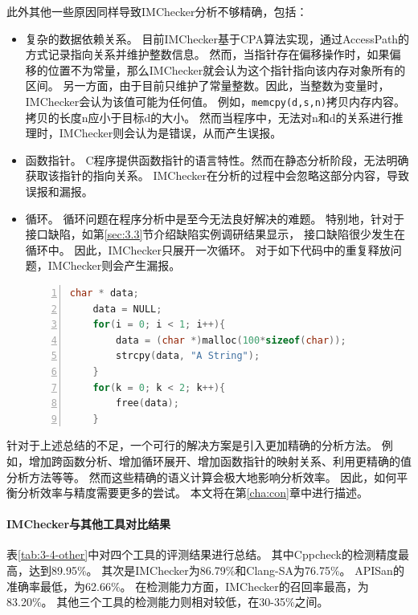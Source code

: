此外其他一些原因同样导致IMChecker分析不够精确，包括：
\begin{itemize}
	\item 复杂的数据依赖关系。
	目前IMChecker基于CPA算法实现，通过AccessPath的方式记录指向关系并维护整数信息。
	然而，当指针存在偏移操作时，如果偏移的位置不为常量，那么IMChecker就会认为这个指针指向该内存对象所有的区间。
	另一方面，由于目前只维护了常量整数。因此，当整数为变量时，IMChecker会认为该值可能为任何值。
	例如，\texttt{memcpy(d,s,n)}拷贝内存内容。
	拷贝的长度n应小于目标d的大小。
	然而当程序中，无法对n和d的关系进行推理时，IMChecker则会认为是错误，从而产生误报。
	\item 函数指针。
	C程序提供函数指针的语言特性。然而在静态分析阶段，无法明确获取该指针的指向关系。
	IMChecker在分析的过程中会忽略这部分内容，导致误报和漏报。
	\item 循环。
	循环问题在程序分析中是至今无法良好解决的难题。
	特别地，针对于接口缺陷，如第\ref{sec:3.3}节介绍缺陷实例调研结果显示，
	接口缺陷很少发生在循环中。
	因此，IMChecker只展开一次循环。
	对于如下代码中的重复释放问题，IMChecker则会产生漏报。
\begin{lstlisting}[language={C},
basicstyle=\linespread{0.7}\listingsfont,
numbers=left,
xleftmargin=.2\textwidth]
	char * data;
	data = NULL;
	for(i = 0; i < 1; i++){
		data = (char *)malloc(100*sizeof(char));
		strcpy(data, "A String");
	}
	for(k = 0; k < 2; k++){
		free(data);
	}
\end{lstlisting}	
\end{itemize}

针对于上述总结的不足，一个可行的解决方案是引入更加精确的分析方法。
例如，增加跨函数分析、增加循环展开、增加函数指针的映射关系、利用更精确的值分析方法等等。
然而这些精确的语义计算会极大地影响分析效率。
因此，如何平衡分析效率与精度需要更多的尝试。
本文将在第\ref{cha:con}章中进行描述。

\paragraph{IMChecker与其他工具对比结果}



表\ref{tab:3-4-other}中对四个工具的评测结果进行总结。
其中Cppcheck的检测精度最高，达到89.95\%。
其次是IMChecker为86.79\%和Clang-SA为76.75\%。
APISan的准确率最低，为62.66\%。
在检测能力方面，IMChecker的召回率最高，为83.20\%。
其他三个工具的检测能力则相对较低，在30-35\%之间。

